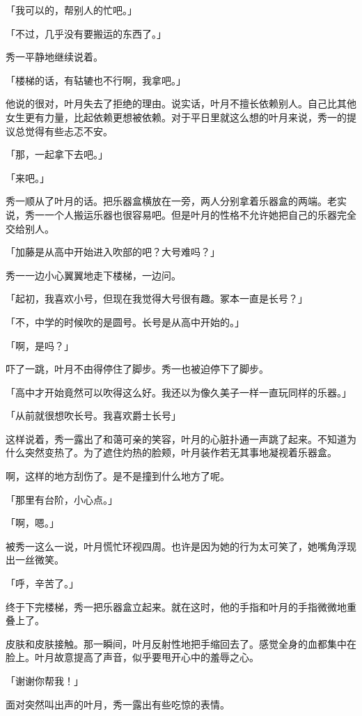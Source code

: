 \documentclass[UTF8]{ctexart}
\begin{document}
    「我可以的，帮别人的忙吧。」

    「不过，几乎没有要搬运的东西了。」

    秀一平静地继续说着。

    「楼梯的话，有轱辘也不行啊，我拿吧。」

    他说的很对，叶月失去了拒绝的理由。说实话，叶月不擅长依赖别人。自己比其他女生更有力量，比起依赖更想被依赖。对于平日里就这么想的叶月来说，秀一的提议总觉得有些忐忑不安。

    「那，一起拿下去吧。」

    「来吧。」

    秀一顺从了叶月的话。把乐器盒横放在一旁，两人分别拿着乐器盒的两端。老实说，秀一一个人搬运乐器也很容易吧。但是叶月的性格不允许她把自己的乐器完全交给别人。

    「加藤是从高中开始进入吹部的吧？大号难吗？」

    秀一一边小心翼翼地走下楼梯，一边问。

    「起初，我喜欢小号，但现在我觉得大号很有趣。冢本一直是长号？」

    「不，中学的时候吹的是圆号。长号是从高中开始的。」

    「啊，是吗？」

    吓了一跳，叶月不由得停住了脚步。秀一也被迫停下了脚步。

    「高中才开始竟然可以吹得这么好。我还以为像久美子一样一直玩同样的乐器。」

    「从前就很想吹长号。我喜欢爵士长号」

    这样说着，秀一露出了和蔼可亲的笑容，叶月的心脏扑通一声跳了起来。不知道为什么突然变热了。为了遮住灼热的脸颊，叶月装作若无其事地凝视着乐器盒。

    啊，这样的地方刮伤了。是不是撞到什么地方了呢。

    「那里有台阶，小心点。」

    「啊，嗯。」

    被秀一这么一说，叶月慌忙环视四周。也许是因为她的行为太可笑了，她嘴角浮现出一丝微笑。

    「呼，辛苦了。」

    终于下完楼梯，秀一把乐器盒立起来。就在这时，他的手指和叶月的手指微微地重叠上了。

    皮肤和皮肤接触。那一瞬间，叶月反射性地把手缩回去了。感觉全身的血都集中在脸上。叶月故意提高了声音，似乎要甩开心中的羞辱之心。

    「谢谢你帮我！」

    面对突然叫出声的叶月，秀一露出有些吃惊的表情。
\end{document}
